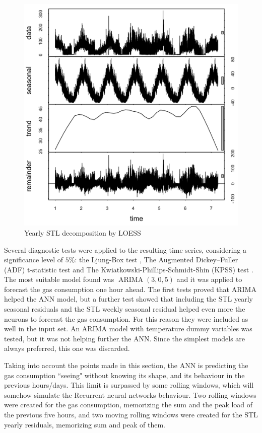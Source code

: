 \documentclass{sig-alternate-sigmod07}
\begin{document}
\begin{figure}
\centering
\includegraphics[width=\columnwidth]{STL.png}
\caption{Yearly STL decomposition by LOESS}
\label{fig:STL}
\end{figure}

Several diagnostic tests were applied to the resulting time series, considering a significance level of $5\%$: the Ljung-Box test \cite{ljung1978measure}, The Augmented Dickey–Fuller (ADF) t-statistic test \cite{dickey1979distribution} and The Kwiatkowski-Phillips-Schmidt-Shin (KPSS) test \cite{kwiatkowski1992testing}. The most suitable model found was $\operatorname{ARIMA} (3,0,5)$ and it was applied to forecast the gas consumption one hour ahead. The first tests proved that ARIMA helped the ANN model, but a further test showed that including the STL yearly seasonal residuals and the STL weekly seasonal residual helped even more the neurons to forecast the gas consumption. For this reason they were included as well in the input set.
An ARIMA model with temperature dummy variables was tested, but it was not helping further the ANN. Since the simplest models are always preferred, this one was discarded.

Taking into account the points made in this section, the ANN is predicting the gas consumption ``seeing" without knowing its shape, and its behaviour in the previous hours/days. This limit is surpassed by some rolling windows, which will somehow simulate the Recurrent neural networks behaviour. Two rolling windows were created for the gas consumption, memorizing the sum and the peak load of the previous five hours, and two moving rolling windows were created for the STL yearly residuals, memorizing sum and peak of them.
\end{document}

